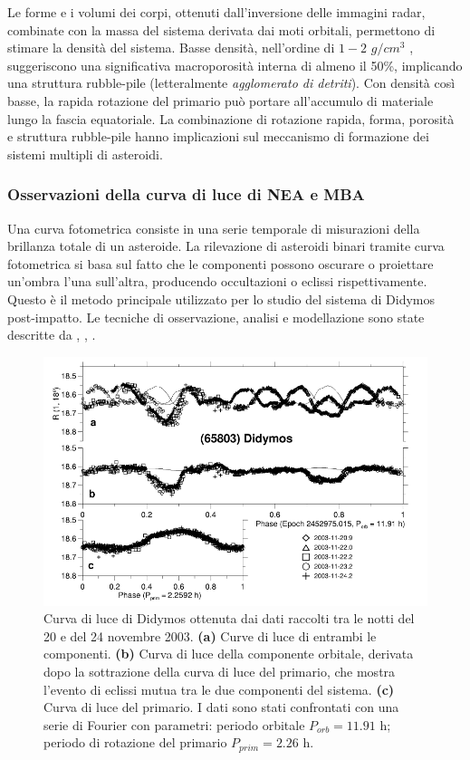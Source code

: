 Le forme e i volumi dei corpi, ottenuti dall'inversione delle immagini radar, combinate con la massa del sistema derivata dai moti orbitali, permettono di stimare la densità del sistema. Basse densità, nell'ordine di $1-2\,\,g/cm^3$ \citep{becker_physical_2015, brozovic_radar_2011}, suggeriscono una significativa macroporosità interna di almeno il 50\%, implicando una struttura rubble-pile (letteralmente \textit{agglomerato di detriti}). Con densità così basse, la rapida rotazione del primario può portare all'accumulo di materiale lungo la fascia equatoriale. La combinazione di rotazione rapida, forma, porosità e struttura rubble-pile hanno implicazioni sul meccanismo di formazione dei sistemi multipli di asteroidi.

\subsubsection{Osservazioni della curva di luce di NEA e MBA}
Una curva fotometrica consiste in una serie temporale di misurazioni della brillanza totale di un asteroide. La rilevazione di asteroidi binari tramite curva fotometrica si basa sul fatto che le componenti possono oscurare o proiettare un'ombra l'una sull'altra, producendo occultazioni o eclissi rispettivamente. Questo è il metodo principale utilizzato per lo studio del sistema di Didymos post-impatto. Le tecniche di osservazione, analisi e modellazione sono state descritte da \citet{pravec_photometric_2006}, \citet{scheirich_modeling_2009}, \citet{scheirich_binary_2015}.

\begin{figure}[!h]
    \centering
    \includegraphics[scale=0.55]{figure/didymos_lightcurve.png}
    \caption[Curva di luce di (65803) Didymos.]{Curva di luce di Didymos ottenuta dai dati raccolti tra le notti del 20 e del 24 novembre 2003. \textbf{(a)} Curve di luce di entrambi le componenti. \textbf{(b)} Curva di luce della componente orbitale, derivata dopo la sottrazione della curva di luce del primario, che mostra l'evento di eclissi mutua tra le due componenti del sistema. \textbf{(c)} Curva di luce del primario. I dati sono stati confrontati con una serie di Fourier con parametri: periodo orbitale $P_{orb}=11.91$ h; periodo di rotazione del primario $P_{prim}=2.26$ h. \citep{pravec_photometric_2006}}
    \label{fig:didymos_lightcurve}
\end{figure}

